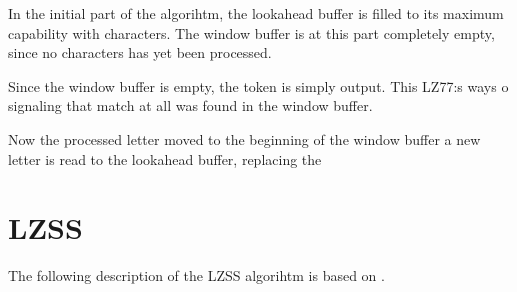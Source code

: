 In the initial part of the algorihtm, the lookahead buffer is filled
to its maximum capability with characters. The window buffer is at
this part completely empty, since no characters has yet been
processed.

\newcommand{\windowsize}{20}
\newcommand{\lookaheadsize}{10}


Since the window buffer is empty, the token  is simply
output. This LZ77:s ways o signaling that match at all was found in
the window buffer.

Now the processed letter moved to the beginning of the window buffer a
new letter is read to the lookahead buffer, replacing the


\section{LZSS}

The following description of the LZSS algorihtm is based on
\cite{Salomon:2004:DCC,mark1996data_compression_book,mcfadden92:_hackin_data_compr_lzss,okumura:_data_compr_algor_larc_lharc}.
